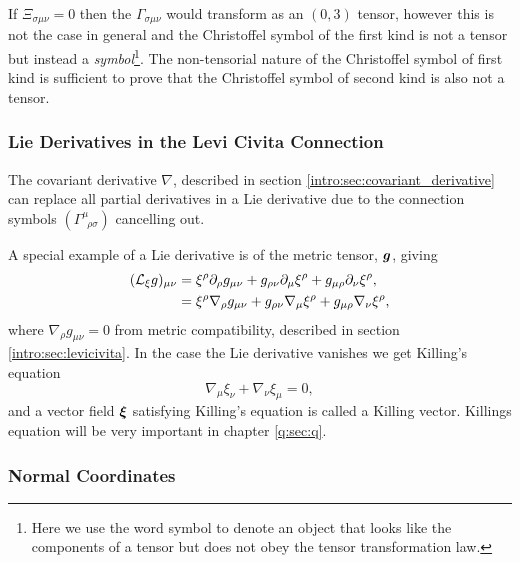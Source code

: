 If $\Xi_{\sigma\mu\nu}=0$ then the $\Gamma_{\sigma\mu\nu}$ would transform as an $(0,3)$ tensor, however this is not the case in general and the Christoffel symbol of the first kind is not a tensor but instead a {\it symbol}\footnote{Here we use the word symbol to denote an object that looks like the components of a tensor but does not obey the tensor transformation law.}. The non-tensorial nature of the Christoffel symbol of first kind is sufficient to prove that the Christoffel symbol of second kind is also not a tensor.


\subsubsection{Lie Derivatives in the Levi Civita Connection}

The covariant derivative $\nabla$, described in section \ref{intro:sec:covariant_derivative} can replace all partial derivatives in a Lie derivative due to the connection symbols $\left( \Gamma^\mu_{\,\,\,\rho\sigma}\right)$ cancelling out.

A special example of a Lie derivative is of the metric tensor, $\boldsymbol{g}$, giving
\begin{align}
(\mathcal{L}_\xi g)_{\mu\nu} &= \xi^\rho \partial_\rho g_{\mu\nu} + g_{\rho\nu}\partial_\mu \xi^\rho + g_{\mu\rho}\partial_\nu \xi^\rho, \\
&= \xi^\rho {\nabla_\rho g_{\mu\nu}} + g_{\rho\nu}\nabla_\mu \xi^\rho  + g_{\mu\rho}\nabla_\nu \xi^\rho,
\end{align}
where $\nabla_\rho g_{\mu\nu}=0$ from metric compatibility, described in section \ref{intro:sec:levicivita}. In the case the Lie derivative vanishes we get Killing's equation
\begin{equation}
\nabla_{\mu}\xi_\nu + \nabla_\nu \xi_\mu =0,
\end{equation}
and a vector field $\boldsymbol\xi$ satisfying Killing's equation is called a Killing vector. Killings equation will be very important in chapter \ref{q:sec:q}.

\subsubsection{Normal Coordinates} \label{intro:sec:normal_coords}

